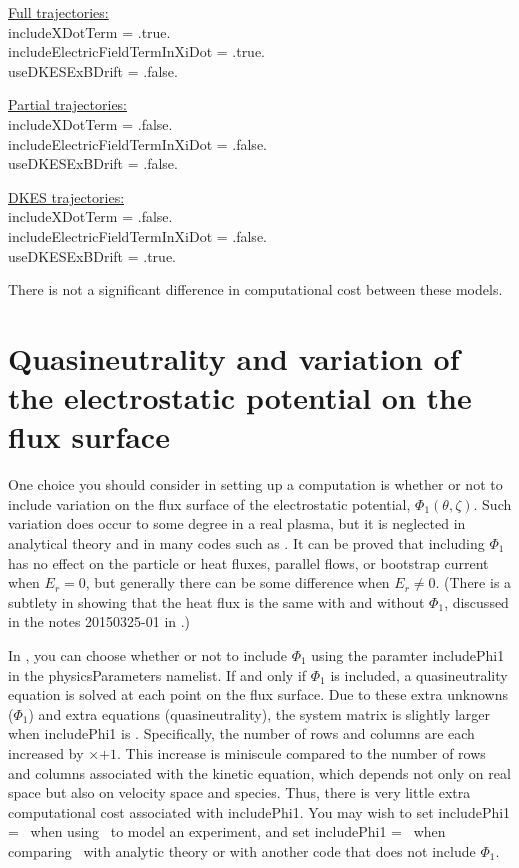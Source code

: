 {\setlength{\parindent}{0cm}

\underline{Full trajectories:}\\
{\ttfamily 
includeXDotTerm = .true.\\
includeElectricFieldTermInXiDot = .true.\\
useDKESExBDrift = .false.\\
}

\underline{Partial trajectories:}\\
{\ttfamily
includeXDotTerm = .false.\\
includeElectricFieldTermInXiDot = .false.\\
useDKESExBDrift = .false.\\
}

\underline{DKES trajectories:}\\
{\ttfamily
includeXDotTerm = .false.\\
includeElectricFieldTermInXiDot = .false.\\
useDKESExBDrift = .true.\\
}
}

There is not a significant difference in computational cost between these models.


\section{Quasineutrality and variation of the electrostatic potential on the flux surface}

One choice you should consider in setting up a computation is whether or not
to include variation on the flux surface of the electrostatic potential, $\Phi_1(\theta,\zeta)$.
Such variation does occur to some degree in a real plasma, but it is 
neglected in analytical theory and in many codes such as \dkes.  It can be proved
that including $\Phi_1$ has no effect on the particle or heat fluxes, parallel flows, or bootstrap current
when $E_r=0$, but generally there can be some difference when $E_r \ne 0$.
(There is a subtlety in showing that the heat flux is the same with and without $\Phi_1$,
discussed in the notes 20150325-01 in .)

In \sfincs, you can choose whether or not to
include $\Phi_1$ using the paramter {\ttfamily includePhi1} in the {\ttfamily physicsParameters}
namelist.  If and only if $\Phi_1$ is included, a quasineutrality equation is solved
at each point on the flux surface.  Due to these extra unknowns ($\Phi_1$) and extra equations
(quasineutrality), the system matrix is slightly larger when {\ttfamily includePhi1} is \true.
Specifically, the number of rows and columns are each increased by \Ntheta$\times$\Nzeta$+1$.  This increase is miniscule compared
to the number of rows and columns associated with the kinetic equation, which depends not only on real space
but also on velocity space and species.  Thus, there is very little extra computational cost associated
with {\ttfamily includePhi1}.  You may wish to set {\ttfamily includePhi1} = \true~when
using \sfincs~to model an experiment, and set  {\ttfamily includePhi1} = \false~when
comparing \sfincs~with analytic theory or with another code that does not include $\Phi_1$.


